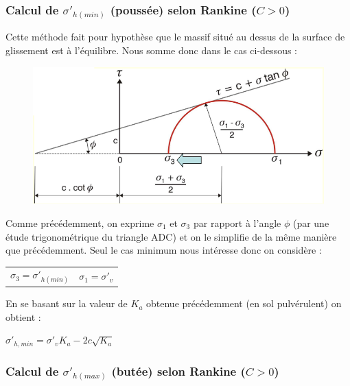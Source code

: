         \subsubsection{Calcul de $\sigma'_{h(min)}$ (poussée) selon Rankine ($C > 0$)}
        
            Cette méthode fait pour hypothèse que le massif situé au dessus de la surface de glissement est à l'équilibre. Nous somme donc dans le cas ci-dessous : 
            
            \begin{figure}[h!]
            \center
            \includegraphics[scale=0.7]{Holeyman/images/H5.PNG}
            \end{figure}
            
            Comme précédemment, on exprime $\sigma_1$ et $\sigma_3$ par rapport à l'angle $\phi$ (par une étude trigonométrique du triangle ADC) et on le simplifie de la même manière que précédemment. Seul le cas minimum nous intéresse donc on considère :
            
            \begin{center}
            \begin{tabular}{cc}
                $\sigma_3 = \sigma'_{h(min)}$ \: \:&
                $\sigma_1 = \sigma'_v$ 
            \end{tabular}
            \end{center}
            
            En se basant sur la valeur de $K_a$ obtenue précédemment (en sol pulvérulent) on obtient :
            
            \begin{center}
                $\sigma'_{h,min} = \sigma'_v K_a - 2 c \sqrt{K_a}$
            \end{center}
        
        \subsubsection{Calcul de $\sigma'_{h(max)}$ (butée) selon Rankine ($C > 0$)}
        
